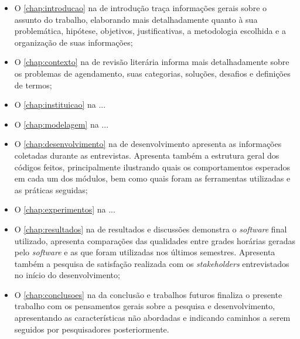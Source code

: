 \begin{itemize}
  \item O \autoref{chap:introducao} na  de introdução traça informações gerais sobre o assunto do trabalho, elaborando mais detalhadamente quanto à sua problemática, hipótese, objetivos, justificativas, a metodologia escolhida e a organização de suas informações;
  \item O \autoref{chap:contexto} na  de revisão literária informa mais detalhadamente sobre os problemas de agendamento, suas categorias, soluções, desafios e definições de termos;
  \item O \autoref{chap:instituicao} na ...
  \item O \autoref{chap:modelagem} na ...
  \item O \autoref{chap:desenvolvimento} na  de desenvolvimento apresenta as informações coletadas durante as entrevistas. Apresenta também a estrutura geral dos códigos feitos, principalmente ilustrando quais os comportamentos esperados em cada um dos módulos, bem como quais foram as ferramentas utilizadas e as práticas seguidas;
  \item O \autoref{chap:experimentos} na ...
  \item O \autoref{chap:resultados} na  de resultados e discussões demonstra o \textit{software} final utilizado, apresenta comparações das qualidades entre grades horárias geradas pelo \textit{software} e as que foram utilizadas nos últimos semestres. Apresenta também a pesquisa de satisfação realizada com os \textit{stakeholders} entrevistados no início do desenvolvimento;
  \item O \autoref{chap:conclusoes} na  da conclusão e trabalhos futuros finaliza o presente trabalho com os pensamentos gerais sobre a pesquisa e desenvolvimento, apresentando as características não abordadas e indicando caminhos a serem seguidos por pesquisadores posteriormente.
\end{itemize}

